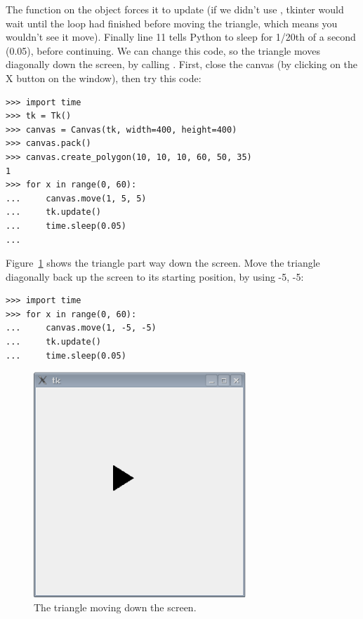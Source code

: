 The function  on the  object forces it to update (if we didn't use , tkinter would wait until the loop had finished before moving the triangle, which means you wouldn't see it move). Finally line 11 tells Python to sleep for 1/20th of a second (0.05), before continuing. We can change this code, so the triangle moves diagonally down the screen, by calling .  First, close the canvas (by clicking on the X button on the window), then try this code:

\begin{listingignore}
\begin{verbatim}
>>> import time
>>> tk = Tk()
>>> canvas = Canvas(tk, width=400, height=400)
>>> canvas.pack()
>>> canvas.create_polygon(10, 10, 10, 60, 50, 35)
1
>>> for x in range(0, 60):
...     canvas.move(1, 5, 5)
...     tk.update()
...     time.sleep(0.05)
...
\end{verbatim}
\end{listingignore}

Figure~\ref{fig45} shows the triangle part way down the screen. Move the triangle diagonally back up the screen to its starting position, by using -5, -5:

\begin{listing}
\begin{verbatim}
>>> import time
>>> for x in range(0, 60):
...     canvas.move(1, -5, -5)
...     tk.update()
...     time.sleep(0.05)
\end{verbatim}
\end{listing}

\begin{figure}
\begin{center}
\includegraphics[width=80mm]{eps/figure45.eps}
\end{center}
\caption{The triangle moving down the screen.}\label{fig45}
\end{figure}

